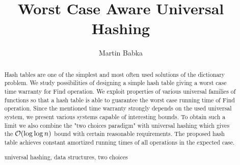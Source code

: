 \documentclass[runningheads,a4paper]{llncs}
\newcommand{\keywords}[1]{\par\addvspace\baselineskip
\noindent\keywordname\enspace\ignorespaces#1}
\begin{document}
\mainmatter

\author{Martin Babka}

\title{Worst Case Aware Universal Hashing}



\maketitle

\begin{abstract}
Hash tables are one of the simplest and most often used solutions of the dictionary problem. 
We study possibilities of designing a simple hash table giving a worst case time warranty for Find operation.
We exploit properties of various universal families of functions so that a hash table is able to guarantee the worst case running time of Find operation.
Since the mentioned time warranty strongly depends on the used universal system, we present various systems capable of interesting bounds.
To obtain such a limit we also combine the "two choices paradigm" with universal hashing which gives the $\mathcal{O}(\log \log n)$ bound with certain reasonable requirements.
The proposed hash table achieves constant amortized running times of all operations in the expected case.

\keywords{universal hashing, data structures, two choices}
\end{abstract}









\end{document}
